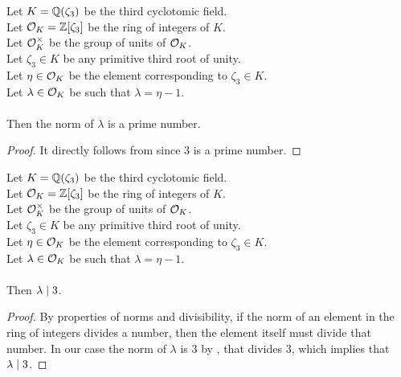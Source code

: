 \begin{lemma}
    \label{lmm:norm_lambda_prime}
    \leanok
    Let $K = \mathbb{Q}(\zeta_3)$ be the third cyclotomic field. \\
    Let $\mathcal{O}_K = \mathbb{Z}[\zeta_3]$ be the ring of integers of $K$. \\
    Let $\mathcal{O}^\times_K$ be the group of units of $\mathcal{O}_K$. \\
    Let $\zeta_3 \in K$ be any primitive third root of unity. \\
    Let $\eta \in \mathcal{O}_K$ be the element corresponding to $\zeta_3 \in K$. \\
    Let $\lambda \in \mathcal{O}_K$ be such that $\lambda = \eta -1$. \\\\
    Then the norm of $\lambda$ is a prime number.
\end{lemma}
\begin{proof}
    \leanok
    It directly follows from  since $3$ is a prime number.
\end{proof}

\begin{lemma}
    \label{lmm:lambda_dvd_three}
    \leanok
    Let $K = \mathbb{Q}(\zeta_3)$ be the third cyclotomic field. \\
    Let $\mathcal{O}_K = \mathbb{Z}[\zeta_3]$ be the ring of integers of $K$. \\
    Let $\mathcal{O}^\times_K$ be the group of units of $\mathcal{O}_K$. \\
    Let $\zeta_3 \in K$ be any primitive third root of unity. \\
    Let $\eta \in \mathcal{O}_K$ be the element corresponding to $\zeta_3 \in K$. \\
    Let $\lambda \in \mathcal{O}_K$ be such that $\lambda = \eta -1$. \\\\
    Then $\lambda \mid 3$.
\end{lemma}
\begin{proof}
    \leanok
    By properties of norms and divisibility, if the norm of an element in the ring of integers
    divides a number, then the element itself must divide that number.
    In our case the norm of $\lambda$ is $3$ by , that divides $3$,
    which implies that $\lambda \mid 3$.
\end{proof}

